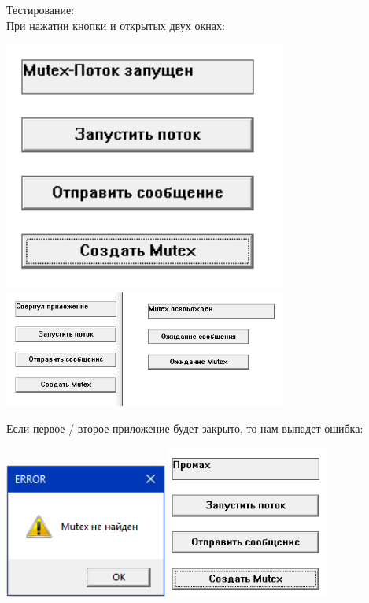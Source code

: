 \documentclass[12pt]{article}
\begin{document}
Тестирование:\\
При нажатии кнопки и открытых двух окнах:\\
\begin{center}
\includegraphics[width=0.7\textwidth]{assets/6.png}\\
\includegraphics[width=0.7\textwidth]{assets/7.png}\\
\end{center}

Если первое / второе приложение будет закрыто, то нам выпадет ошибка:\\
\begin{center}
\includegraphics[width=0.4\textwidth]{assets/8.png}
\includegraphics[width=0.4\textwidth]{assets/9.png}\\
\end{center}
\end{document}
